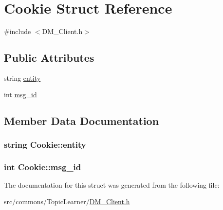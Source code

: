 \hypertarget{struct_cookie}{
\section{Cookie Struct Reference}
\label{struct_cookie}
}


{\ttfamily \#include $<$DM\_\-Client.h$>$}

\subsection*{Public Attributes}
\begin{DoxyCompactItemize}
\item 
string \hyperlink{struct_cookie_af682661b60384bdf6eb3a4e06e3acfa7}{entity}
\item 
int \hyperlink{struct_cookie_a21043e54cb9fa8d0d3ca1c6892f02a93}{msg\_\-id}
\end{DoxyCompactItemize}


\subsection{Member Data Documentation}
\hypertarget{struct_cookie_af682661b60384bdf6eb3a4e06e3acfa7}{
\subsubsection[{entity}]{\setlength{\rightskip}{0pt plus 5cm}string {\bf Cookie::entity}}}
\label{struct_cookie_af682661b60384bdf6eb3a4e06e3acfa7}
\hypertarget{struct_cookie_a21043e54cb9fa8d0d3ca1c6892f02a93}{
\subsubsection[{msg\_\-id}]{\setlength{\rightskip}{0pt plus 5cm}int {\bf Cookie::msg\_\-id}}}
\label{struct_cookie_a21043e54cb9fa8d0d3ca1c6892f02a93}


The documentation for this struct was generated from the following file:\begin{DoxyCompactItemize}
\item 
src/commons/TopicLearner/\hyperlink{_d_m___client_8h}{DM\_\-Client.h}\end{DoxyCompactItemize}

